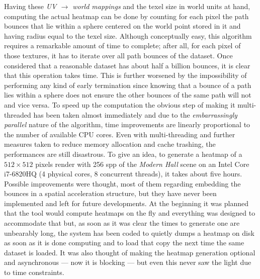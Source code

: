 Having these \textit{UV $\to$ world mappings} and the texel size in world units at hand, computing the actual heatmap can be done by counting for each pixel the path bounces that lie within a sphere centered on the world point stored in it and having radius equal to the texel size. 
Although conceptually easy, this algorithm requires a remarkable amount of time to complete; after all, for each pixel of those textures, it has to iterate over all path bounces of the dataset. Once considered that a reasonable dataset has about half a billion bounces, it is clear that this operation takes time. This is further worsened by the impossibility of performing any kind of early termination since knowing that a bounce of a path lies within a sphere does not ensure the other bounces of the same path will not and vice versa.
To speed up the computation the obvious step of making it multi-threaded has been taken almost immediately and due to the \textit{embarrassingly parallel} nature of the algorithm, time improvements are linearly proportional to the number of available CPU cores. Even with multi-threading and further measures taken to reduce memory allocation and cache trashing, the performances are still disastrous. To give an idea, to generate a heatmap of a $512 \times 512$ pixels render with 256 spp of the \textit{Modern Hall} \cite{bitterliscenes} scene on an Intel Core i7-6820HQ (4 physical cores, 8 concurrent threads), it takes about five hours. Possible improvements were thought, most of them regarding embedding the bounces in a spatial acceleration structure, but they have never been implemented and left for future developments. At the beginning it was planned that the tool would compute heatmaps on the fly and everything was designed to accommodate that but, as soon as it was clear the times to generate one are unbearably long, the system has been coded to quietly dumps a heatmap on disk as soon as it is done computing and to load that copy the next time the same dataset is loaded. It was also thought of making the heatmap generation optional and asynchronous --- now it is blocking --- but even this never saw the light due to time constraints.



